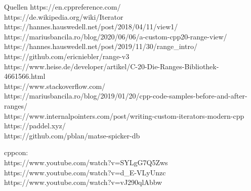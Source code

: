 \begin{frame}[allowframebreaks]{Quellen}
    \small
    https://en.cppreference.com/ \\
    https://de.wikipedia.org/wiki/Iterator \\
    https://hannes.hauswedell.net/post/2018/04/11/view1/ \\
    https://mariusbancila.ro/blog/2020/06/06/a-custom-cpp20-range-view/ \\
    https://hannes.hauswedell.net/post/2019/11/30/range\_intro/ \\
    https://github.com/ericniebler/range-v3 \\
    https://www.heise.de/developer/artikel/C-20-Die-Ranges-Bibliothek-4661566.html \\
    https://www.stackoverflow.com/ \\
    https://mariusbancila.ro/blog/2019/01/20/cpp-code-samples-before-and-after-ranges/ \\
    https://www.internalpointers.com/post/writing-custom-iterators-modern-cpp \\

    https://paddel.xyz/ \\
    https://github.com/pblan/matse-spicker-db

    \vspace{1em}

    cppcon:\\
    https://www.youtube.com/watch?v=SYLgG7Q5Zws \\
    https://www.youtube.com/watch?v=d\_E-VLyUnzc \\
    https://www.youtube.com/watch?v=vJ290qlAbbw
\end{frame}